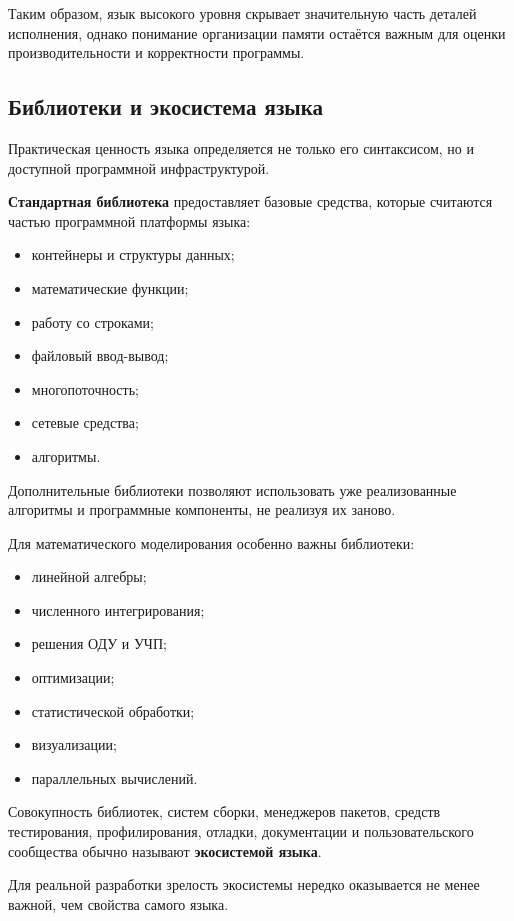 Таким образом, язык высокого уровня скрывает значительную часть деталей
исполнения, однако понимание организации памяти остаётся важным для оценки
производительности и корректности программы.

\subsection{Библиотеки и экосистема языка}

Практическая ценность языка определяется не только его синтаксисом, но и
доступной программной инфраструктурой.

\textbf{Стандартная библиотека} предоставляет базовые средства, которые
считаются частью программной платформы языка:

\begin{itemize}
	\item контейнеры и структуры данных;
	\item математические функции;
	\item работу со строками;
	\item файловый ввод-вывод;
	\item многопоточность;
	\item сетевые средства;
	\item алгоритмы.
\end{itemize}

Дополнительные библиотеки позволяют использовать уже реализованные алгоритмы
и программные компоненты, не реализуя их заново.

Для математического моделирования особенно важны библиотеки:

\begin{itemize}
	\item линейной алгебры;
	\item численного интегрирования;
	\item решения ОДУ и УЧП;
	\item оптимизации;
	\item статистической обработки;
	\item визуализации;
	\item параллельных вычислений.
\end{itemize}

Совокупность библиотек, систем сборки, менеджеров пакетов, средств
тестирования, профилирования, отладки, документации и пользовательского
сообщества обычно называют \textbf{экосистемой языка}.

Для реальной разработки зрелость экосистемы нередко оказывается не менее
важной, чем свойства самого языка.

